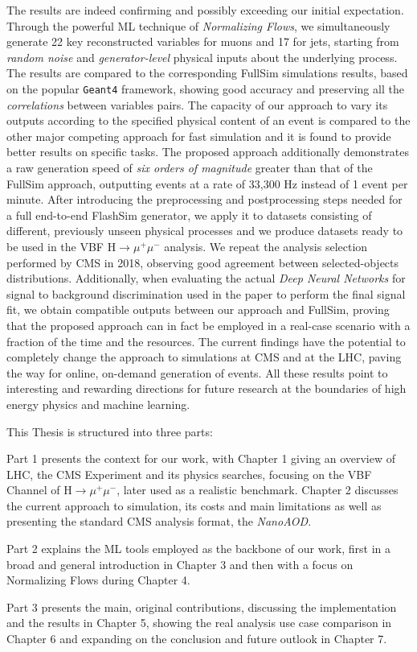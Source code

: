The results are indeed confirming and possibly exceeding our initial expectation. Through the powerful ML technique of \emph{Normalizing Flows}, we simultaneously generate 22 key reconstructed variables for muons and 17 for jets, starting from \emph{random noise} and \emph{generator-level} physical inputs about the underlying process. The results are compared to the corresponding FullSim simulations results, based on the popular \texttt{Geant4} framework, showing good accuracy and preserving all the \emph{correlations} between variables pairs. 
The capacity of our approach to vary its outputs according to the specified physical content of an event is compared to the other major competing approach for fast simulation and it is found to provide better results on specific tasks. The proposed approach additionally demonstrates a raw generation speed of \emph{six orders of magnitude} greater than that of the FullSim approach, outputting events at a rate of 33,300 Hz instead of 1 event per minute. After introducing the preprocessing and postprocessing steps needed for a full end-to-end FlashSim generator, we apply it to datasets consisting of different, previously unseen physical processes and we produce datasets ready to be used in the VBF H$\rightarrow\mu^+\mu^-$ analysis. We repeat the analysis selection performed by CMS in 2018, observing good agreement between selected-objects distributions. Additionally, when evaluating the actual \emph{Deep Neural Networks} for signal to background discrimination used in the paper to perform the final signal fit, we obtain compatible outputs between our approach and FullSim, proving that the proposed approach can in fact be employed in a real-case scenario with a fraction of the time and the resources.
The current findings have the potential to completely change the approach to simulations at CMS and at the LHC, paving the way for online, on-demand generation of events. All these results point to interesting and rewarding directions for future research at the boundaries of high energy physics and machine learning.

This Thesis is structured into three parts:

Part 1 presents the context for our work, with Chapter 1 giving an overview of LHC, the CMS Experiment and its physics searches, focusing on the VBF Channel of H$\rightarrow\mu^+\mu^-$, later used as a realistic benchmark. Chapter 2 discusses the current approach to simulation, its costs and main limitations as well as presenting the standard CMS analysis format, the \emph{NanoAOD}.

Part 2 explains the ML tools employed as the backbone of our work, first in a broad and general introduction in Chapter 3 and then with a focus on Normalizing Flows during Chapter 4.

Part 3 presents the main, original contributions, discussing the implementation and the results in Chapter 5, showing the real analysis use case comparison in Chapter 6 and expanding on the conclusion and future outlook in Chapter 7. 

\endgroup

\vfill
